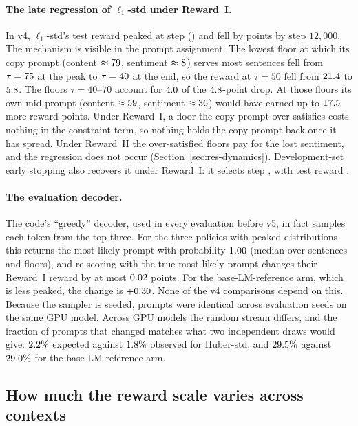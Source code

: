 \paragraph{The late regression of $\ell_1$-std under Reward~I.}
In v4, $\ell_1$-std's test reward peaked at step \vLonePeakStep{}
(\vLonePeakRew) and fell by \vLoneDrop{} points by step $12{,}000$. The
mechanism is visible in the prompt assignment. The lowest floor at which its copy
prompt (content $\approx79$, sentiment $\approx8$) serves most sentences fell
from $\tau = 75$ at the peak to $\tau = 40$ at
the end, so the reward at $\tau = 50$ fell from $21.4$ to
$5.8$. The floors $\tau = 40$--$70$ account for
$4.0$ of the $4.8$-point drop. At those floors its own mid
prompt (content $\approx59$, sentiment $\approx36$) would have earned up to
$17.5$ more reward points. Under Reward~I, a floor the copy prompt
over-satisfies costs nothing in the constraint term, so nothing
holds the copy prompt back once it has spread. Under Reward~II the over-satisfied
floors pay for the lost sentiment, and the regression does not occur
(Section~\ref{sec:res-dynamics}). Development-set early stopping also recovers
it under Reward~I: it selects step \vLoneDevStep, with test reward
\vLoneDevRew.

\paragraph{The evaluation decoder.}
The code's ``greedy'' decoder, used in every evaluation before v5, in fact
samples each token from the top three. For the three policies with peaked
distributions this returns the most likely prompt with probability
$1.00$ (median over sentences and floors), and re-scoring with the true
most likely prompt changes their Reward~I reward by at most
$0.02$ points. For the base-LM-reference arm, which is less
peaked, the change is $+0.30$. None of the v4 comparisons
depend on this. Because the sampler is seeded, prompts were identical across
evaluation seeds on the same GPU model. Across GPU models the random stream
differs, and the fraction of prompts that changed matches what two independent
draws would give: $2.2\%$ expected against
$1.8\%$ observed for Huber-std, and $29.5\%$ against
$29.0\%$ for the base-LM-reference arm.

\subsection{How much the reward scale varies across contexts}
\label{sec:res-scale}

